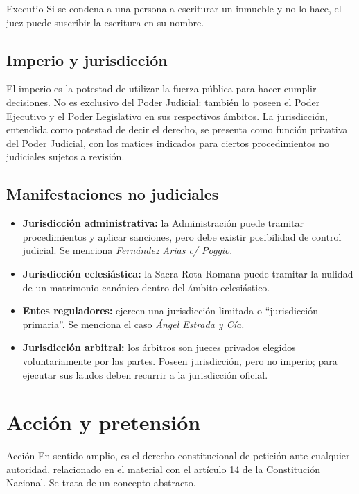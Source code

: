 \documentclass[12pt,oneside]{book}
\begin{document}
\begin{example}{Executio}
Si se condena a una persona a escriturar un inmueble y no lo hace, el juez puede suscribir la escritura en su nombre.
\end{example}

\subsection{Imperio y jurisdicción}
El imperio es la potestad de utilizar la fuerza pública para hacer cumplir decisiones. No es exclusivo del Poder Judicial: también lo poseen el Poder Ejecutivo y el Poder Legislativo en sus respectivos ámbitos. La jurisdicción, entendida como potestad de decir el derecho, se presenta como función privativa del Poder Judicial, con los matices indicados para ciertos procedimientos no judiciales sujetos a revisión.

\subsection{Manifestaciones no judiciales}
\begin{itemize}
\item \textbf{Jurisdicción administrativa:} la Administración puede tramitar procedimientos y aplicar sanciones, pero debe existir posibilidad de control judicial. Se menciona \textit{Fernández Arias c/ Poggio}.
\item \textbf{Jurisdicción eclesiástica:} la Sacra Rota Romana puede tramitar la nulidad de un matrimonio canónico dentro del ámbito eclesiástico.
\item \textbf{Entes reguladores:} ejercen una jurisdicción limitada o ``jurisdicción primaria''. Se menciona el caso \textit{Ángel Estrada y Cía.}
\item \textbf{Jurisdicción arbitral:} los árbitros son jueces privados elegidos voluntariamente por las partes. Poseen jurisdicción, pero no imperio; para ejecutar sus laudos deben recurrir a la jurisdicción oficial.
\end{itemize}

\section{Acción y pretensión}
\begin{definition}{Acción}
En sentido amplio, es el derecho constitucional de petición ante cualquier autoridad, relacionado en el material con el artículo 14 de la Constitución Nacional. Se trata de un concepto abstracto.
\end{definition}
\end{document}
